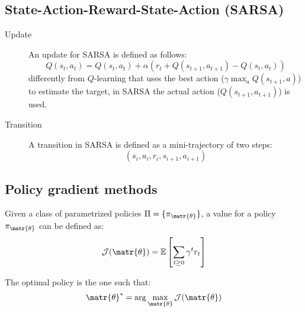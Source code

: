 \subsection{State-Action-Reward-State-Action (SARSA)}

\begin{description}
    \item[Update] 
        An update for SARSA is defined as follows:
        \[ Q(s_t, a_t) = Q(s_t, a_t) + \alpha \left( r_t + Q(s_{t+1}, a_{t+1}) - Q(s_t, a_t) \right) \]
        differently from $Q$-learning that uses the best action ($\gamma\max_aQ(s_{t+1}, a)$) to estimate the target, in SARSA the actual action ($Q(s_{t+1}, a_{t+1})$) is used.

    \item[Transition]
        A transition in SARSA is defined as a mini-trajectory of two steps:
        \[ (s_i, a_i, r_i, s_{i+1}, a_{i+1}) \]
\end{description}


\subsection{Policy gradient methods}

Given a class of parametrized policies $\Pi = \{ \pi_\matr{\theta} \}$, a value for a policy $\pi_\matr{\theta}$ can be defined as:
\[ \mathcal{J}(\matr{\theta}) = \mathbb{E} \left[ \sum_{t \geq 0} \gamma^t r_t \right] \]

The optimal policy is the one such that:
\[ \matr{\theta}^* = \arg\max_\matr{\theta} \mathcal{J}(\matr{\theta}) \]

